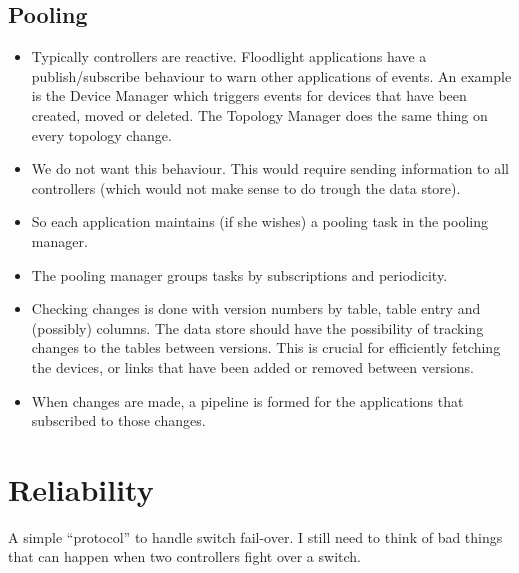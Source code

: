 \subsection{Pooling}
\begin{itemize}
\item Typically controllers are reactive. Floodlight applications have a publish/subscribe behaviour to warn other applications of events. An example is the Device Manager which triggers events for devices that have been created, moved or deleted. The Topology Manager does the same thing on every topology change. 
\item We do not want this behaviour. This would require sending information to all controllers (which would not make sense to do trough the data store). 
\item So each application maintains (if she wishes) a pooling task in the pooling manager. 
\item The pooling manager groups tasks by subscriptions and periodicity. 
\item Checking changes is done with version numbers by table, table entry and (possibly) columns. The data store should have the possibility of tracking changes to the tables between versions. This is crucial for efficiently fetching the devices, or links that have been added or removed between versions. 
\item When changes are made, a pipeline is formed for the applications that subscribed to those changes. 
\end{itemize}

\section{Reliability}
A simple ``protocol'' to handle switch fail-over. I still need to think of bad things that can happen when two controllers fight over a switch.
